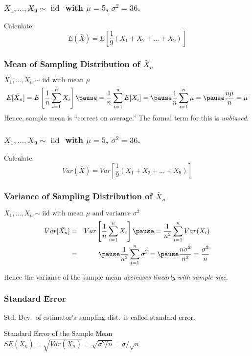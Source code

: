\documentclass{beamer}
\begin{document}
\begin{frame}
\frametitle{$X_1,\hdots, X_{9} \sim \mbox{ iid }$ with $\mu=5$, $\sigma^2 =36$. }

\large Calculate:
	 $$E(\bar{X}) = E\left[\frac{1}{9}(X_1 + X_2 + \hdots + X_{9})\right]$$
\end{frame}
\begin{frame}
\frametitle{Mean of Sampling Distribution of $\bar{X}_n$}
\alert{$X_1, \hdots, X_n \sim \mbox{iid with mean }\mu$}
\begin{eqnarray*}
E[\bar{X_n}] = E\left[ \frac{1}{n}\sum_{i=1}^n X_i \right]\pause = \frac{1}{n} \sum_{i=1}^n E[X_i] = \pause\frac{1}{n} \sum_{i=1}^n \mu = \pause \frac{n\mu}{n} = \mu
\end{eqnarray*}
\alert{Hence, sample mean is ``correct on average.'' The formal term for this is \emph{unbiased}.}
\end{frame}

\begin{frame}
\frametitle{$X_1,\hdots, X_{9} \sim \mbox{ iid }$ with $\mu=5$, $\sigma^2 = 36$. }

\large Calculate:
	 $$Var(\bar{X}) = Var\left[\frac{1}{9}(X_1 + X_2 + \hdots + X_{9})\right]$$
\end{frame}

\begin{frame}
\frametitle{Variance of Sampling Distribution of $\bar{X}_n$}
\alert{$X_1, \hdots, X_n \sim \mbox{iid with mean }\mu \mbox{ and variance } \sigma^2$}
\begin{eqnarray*}
Var[\bar{X_n}] &=& Var\left[ \frac{1}{n}\sum_{i=1}^n X_i \right] \pause= \frac{1}{n^2} \sum_{i=1}^n Var(X_i) \\
&=& \pause \frac{1}{n^2} \sum_{i=1}^n \sigma^2 = \pause \frac{n\sigma^2}{n^2} =  \frac{\sigma^2}{n}
\end{eqnarray*}

\alert{Hence the variance of the sample mean \emph{decreases linearly with sample size}.}
\end{frame}
\begin{frame}
\frametitle{Standard Error}
Std. Dev.\ of estimator's sampling dist.\ is called \alert{standard error}.
\begin{block}{Standard Error of the Sample Mean}
$SE(\bar{X}_n)= \sqrt{Var\left(\bar{X}_n\right)}= \sqrt{\sigma^2/n}=\sigma/\sqrt{n}$
\end{block}
\end{frame}
\end{document}
